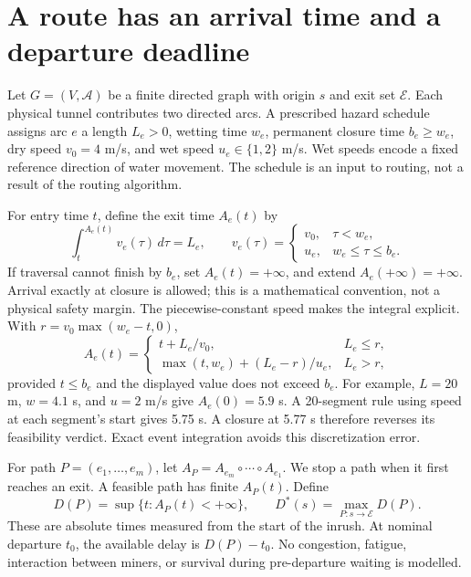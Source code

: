 \documentclass[11pt]{article}
\newcommand{\A}{\mathcal A}
\newcommand{\E}{\mathcal E}
\newcommand{\infv}{+\infty}
\begin{document}
\section{A route has an arrival time and a departure deadline}
\label{sec:model}
Let $G=(V,\A)$ be a finite directed graph with origin $s$ and exit set $\E$. Each physical tunnel contributes two directed arcs. A prescribed hazard schedule assigns arc $e$ a length $L_e>0$, wetting time $w_e$, permanent closure time $b_e\ge w_e$, dry speed $v_0=4$ m/s, and wet speed $u_e\in\{1,2\}$ m/s. Wet speeds encode a fixed reference direction of water movement. The schedule is an input to routing, not a result of the routing algorithm.

For entry time $t$, define the exit time $A_e(t)$ by
\begin{equation}
 \int_t^{A_e(t)}v_e(\tau)\,d\tau=L_e,\qquad
 v_e(\tau)=
 \begin{cases}v_0,&\tau<w_e,\\u_e,&w_e\le\tau\le b_e.\end{cases}
 \label{eq:integral}
\end{equation}
If traversal cannot finish by $b_e$, set $A_e(t)=\infv$, and extend $A_e(\infv)=\infv$. Arrival exactly at closure is allowed; this is a mathematical convention, not a physical safety margin. The piecewise-constant speed makes the integral explicit. With $r=v_0\max(w_e-t,0)$,
\begin{equation}
 A_e(t)=
 \begin{cases}
 t+L_e/v_0,& L_e\le r,\\
 \max(t,w_e)+(L_e-r)/u_e,&L_e>r,
 \end{cases}
 \label{eq:forward}
\end{equation}
provided $t\le b_e$ and the displayed value does not exceed $b_e$.
For example, $L=20$ m, $w=4.1$ s, and $u=2$ m/s give $A_e(0)=5.9$ s. A 20-segment rule using speed at each segment's start gives 5.75 s. A closure at 5.77 s therefore reverses its feasibility verdict. Exact event integration avoids this discretization error.

For path $P=(e_1,\ldots,e_m)$, let $A_P=A_{e_m}\circ\cdots\circ A_{e_1}$. We stop a path when it first reaches an exit. A feasible path has finite $A_P(t)$. Define
\begin{equation}
 D(P)=\sup\{t:A_P(t)<\infv\},\qquad
 D^*(s)=\max_{P:s\to\E}D(P).
 \label{eq:deadline}
\end{equation}
These are absolute times measured from the start of the inrush. At nominal departure $t_0$, the available delay is $D(P)-t_0$. No congestion, fatigue, interaction between miners, or survival during pre-departure waiting is modelled.
\end{document}
